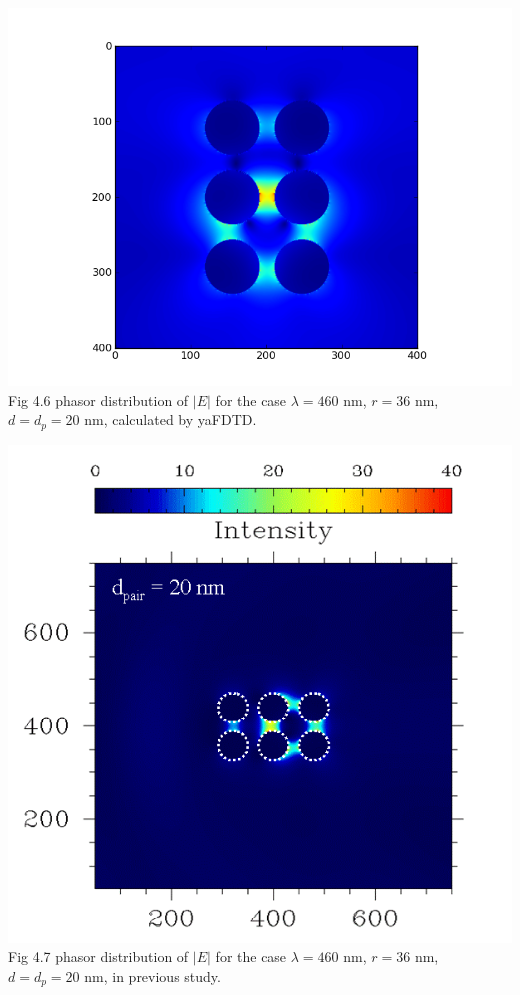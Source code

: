 \documentclass[openany]{book}
\begin{document}
\begin{center}
\includegraphics[scale=0.8]{images/etotal.png}\\
Fig 4.6
phasor distribution of $|E|$ for the case $\lambda = 460$ nm, $r = 36$ nm, $d = d_p = 20$ nm, calculated by yaFDTD.
\end{center}
\begin{center}
\includegraphics[scale=0.5]{images/r36.png}\\
Fig 4.7
phasor distribution of $|E|$ for the case $\lambda = 460$ nm, $r = 36$ nm, $d = d_p = 20$ nm, in previous study.
\end{center}
\end{document}
